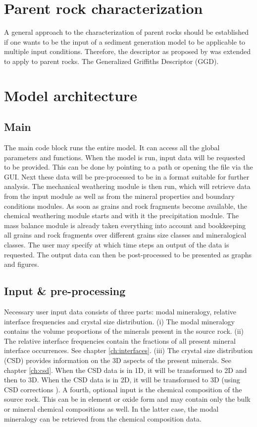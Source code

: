 \section{Parent rock characterization}
    A general approach to the characterization of parent rocks should be established if one wants to be the input of a sediment generation model to be applicable to multiple input conditions. %
    Therefore, the descriptor as proposed by \cite{Griffiths_1952,Griffiths_1961} was extended to apply to parent rocks. %
    The Generalized Griffiths Descriptor (\gls{GGD}). %


\section{Model architecture}
    \subsection{Main}
    The main code block runs the entire model. %
    It can access all the global parameters and functions. %
    When the model is run, input data will be requested to be provided. %
    This can be done by pointing to a path or opening the file via the GUI. %
    Next these data will be pre-processed to be in a format suitable for further analysis. %
    The mechanical weathering module is then run, which will retrieve data from the input module as well {}as from the mineral properties and boundary conditions modules. %
    As soon as grains and rock fragments become available, the chemical weathering module starts and with it the precipitation module. %
    The mass balance module is already taken everything into account and bookkeeping all grains and rock fragments over different grains size classes and mineralogical classes. %
    The user may specify at which time steps an output of the data is requested. %
    The output data can then be post-processed to be presented as graphs and figures. %

    \subsection{Input \& pre-processing}
    Necessary user input data consists of three parts: modal mineralogy, relative interface frequencies and crystal size distribution. %
    (i) The modal mineralogy contains the volume proportions of the minerals present in the source rock. %
    (ii) The relative interface frequencies contain the fractions of all present mineral interface occurrences. %
    See chapter \ref{ch:interfaces}. %
    (iii) The crystal size distribution (CSD) provides information on the 3D aspects of the present minerals. %
    See chapter \ref{ch:csd}. %
    When the CSD data is in 1D, it will be transformed to 2D and then to 3D. %
    When the CSD data is in 2D, it will be transformed to 3D (using CSD corrections \cite{Higgins_2010}). %
    A fourth, optional input is the chemical composition of the source rock. %
    This can be in element or oxide form and may contain only the bulk or mineral chemical compositions as well. %
    In the latter case, the modal mineralogy can be retrieved from the chemical composition data. %

